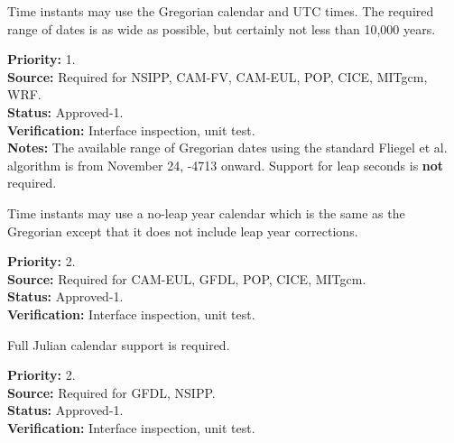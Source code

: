\label{req:calendar}

Time instants may use the Gregorian calendar and UTC times.  The required 
range of dates is as wide as possible, but certainly not less than 10,000 years.
\begin{reqlist}
{\bf Priority:} 1.\\
{\bf Source:} Required for NSIPP, CAM-FV, CAM-EUL, POP, CICE, MITgcm, WRF. \\
{\bf Status:} Approved-1. \\
{\bf Verification:} Interface inspection, unit test. \\
{\bf Notes:} The available range of Gregorian dates using the standard 
Fliegel et al.\cite{Fli68} algorithm is from November 24, -4713 onward.
Support for leap seconds is {\bf not} required.
\end{reqlist}

Time instants may use a no-leap year calendar which is the same as the Gregorian
except that it does not include leap year corrections.  
\begin{reqlist}
{\bf Priority:} 2. \\
{\bf Source:} Required for CAM-EUL, GFDL, POP, CICE, MITgcm. \\
{\bf Status:} Approved-1. \\
{\bf Verification:} Interface inspection, unit test. 
\end{reqlist}

Full Julian calendar support is required.
\begin{reqlist}
{\bf Priority:} 2. \\
{\bf Source:} Required for GFDL, NSIPP. \\
{\bf Status:} Approved-1. \\
{\bf Verification:} Interface inspection, unit test. 
\end{reqlist}


